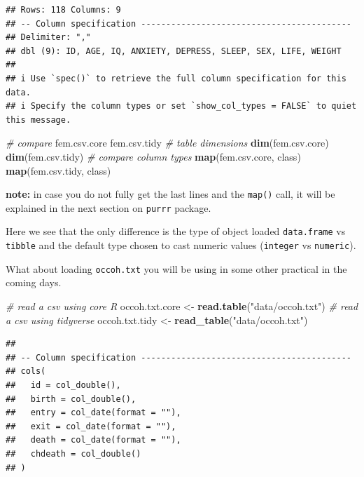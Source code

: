 \documentclass[
]{book}
\newenvironment{Shaded}{\begin{snugshade}}{\end{snugshade}}
\newcommand{\CommentTok}[1]{\textcolor[rgb]{0.56,0.35,0.01}{\textit{#1}}}
\newcommand{\FunctionTok}[1]{\textcolor[rgb]{0.13,0.29,0.53}{\textbf{#1}}}
\newcommand{\NormalTok}[1]{#1}
\newcommand{\OtherTok}[1]{\textcolor[rgb]{0.56,0.35,0.01}{#1}}
\newcommand{\StringTok}[1]{\textcolor[rgb]{0.31,0.60,0.02}{#1}}
\begin{document}
\begin{verbatim}
## Rows: 118 Columns: 9
## -- Column specification ------------------------------------------
## Delimiter: ","
## dbl (9): ID, AGE, IQ, ANXIETY, DEPRESS, SLEEP, SEX, LIFE, WEIGHT
## 
## i Use `spec()` to retrieve the full column specification for this data.
## i Specify the column types or set `show_col_types = FALSE` to quiet this message.
\end{verbatim}

\begin{Shaded}
\begin{Highlighting}[]
\CommentTok{\# compare}
\NormalTok{fem.csv.core}
\NormalTok{fem.csv.tidy}
\CommentTok{\# table dimensions}
\FunctionTok{dim}\NormalTok{(fem.csv.core)}
\FunctionTok{dim}\NormalTok{(fem.csv.tidy)}
\CommentTok{\# compare column types}
\FunctionTok{map}\NormalTok{(fem.csv.core, class)}
\FunctionTok{map}\NormalTok{(fem.csv.tidy, class)}
\end{Highlighting}
\end{Shaded}

\textbf{note:} in case you do not fully get the last lines and the \texttt{map()} call, it will be explained in the next section on \texttt{purrr} package.

Here we see that the only difference is the type of object loaded \texttt{data.frame} vs \texttt{tibble} and the default type chosen to cast numeric values (\texttt{integer} vs \texttt{numeric}).

What about loading \texttt{occoh.txt} you will be using in some other practical in the coming days.

\begin{Shaded}
\begin{Highlighting}[]
\CommentTok{\# read a csv using core R}
\NormalTok{occoh.txt.core }\OtherTok{\textless{}{-}} \FunctionTok{read.table}\NormalTok{(}\StringTok{"data/occoh.txt"}\NormalTok{)}
\CommentTok{\# read a csv using tidyverse}
\NormalTok{occoh.txt.tidy }\OtherTok{\textless{}{-}} \FunctionTok{read\_table}\NormalTok{(}\StringTok{"data/occoh.txt"}\NormalTok{)}
\end{Highlighting}
\end{Shaded}

\begin{verbatim}
## 
## -- Column specification ------------------------------------------
## cols(
##   id = col_double(),
##   birth = col_double(),
##   entry = col_date(format = ""),
##   exit = col_date(format = ""),
##   death = col_date(format = ""),
##   chdeath = col_double()
## )
\end{verbatim}
\end{document}
